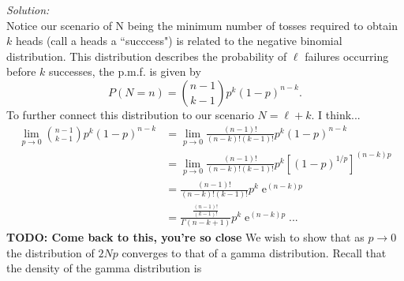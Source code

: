 \documentclass[10pt]{amsart}
\DeclareMathOperator{\E}{e}
\begin{document}
\noindent
\textit{Solution:} \\
Notice our scenario of N being the minimum number of tosses required to obtain $k$ heads (call a heads a ``succcess") is related to the negative binomial distribution.
This distribution describes the probability of $\ell$ failures occurring before $k$ successes, the p.m.f. is given by
$$
P(N = n) = {n - 1 \choose k - 1} p^k (1 - p)^{n - k}.
$$
To further connect this distribution to our scenario $N = \ell + k$.
I think... \\
\begin{align*}
\lim_{p \rightarrow 0} {n - 1 \choose k - 1} p^k (1 - p)^{n - k}
	&= \lim_{p \rightarrow 0} \frac {(n - 1)!}{(n - k)! (k - 1)!} p^k (1 - p)^{n - k} \\
	&= \lim_{p \rightarrow 0} \frac {(n - 1)!}{(n - k)! (k - 1)!} p^k \left[(1 - p)^{1/p}\right]^{(n - k)p} \\
	&= \frac {(n - 1)!}{(n - k)! (k - 1)!} p^k \E^{(n - k)p} \\
	&= \frac {\frac{(n - 1)!}{(k - 1)!}}{\Gamma(n - k + 1)} p^k \E^{(n - k)p} ...
\end{align*} 
\textbf{TODO: Come back to this, you're so close}
We wish to show that as $p \rightarrow 0$ the distribution of $2Np$ converges to that of a gamma distribution.
Recall that the density of the gamma distribution is \\
\end{document}
